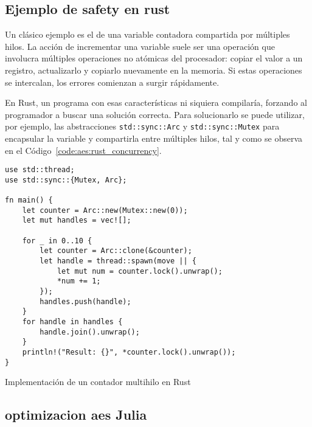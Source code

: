 \subsection{Ejemplo de safety en rust}

Un clásico ejemplo es el de una variable contadora compartida por múltiples hilos. La acción de incrementar una variable suele ser una operación que involucra múltiples operaciones no atómicas del procesador: copiar el valor a un registro, actualizarlo y copiarlo nuevamente en la memoria. Si estas operaciones se intercalan, los errores comienzan a surgir rápidamente.
    
En Rust, un programa con esas características ni siquiera compilaría, forzando al programador a buscar una solución correcta. Para solucionarlo se puede utilizar, por ejemplo, las abstracciones \lstinline{std::sync::Arc} y \lstinline{std::sync::Mutex} para encapsular la variable y compartirla entre múltiples hilos, tal y como se observa en el Código~\ref{code:aes:rust_concurrency}.

\begin{listing}[h]
\begin{verbatim}
use std::thread;
use std::sync::{Mutex, Arc};

fn main() {
    let counter = Arc::new(Mutex::new(0));
    let mut handles = vec![];

    for _ in 0..10 {
        let counter = Arc::clone(&counter);
        let handle = thread::spawn(move || {
            let mut num = counter.lock().unwrap();
            *num += 1;
        });
        handles.push(handle);
    }
    for handle in handles {
        handle.join().unwrap();
    }
    println!("Result: {}", *counter.lock().unwrap());
}
\end{verbatim}
\caption{Implementación de un contador multihilo en Rust}
\label{code:aes:rust_concurrency}
\end{listing}

\subsection{optimizacion aes Julia}

